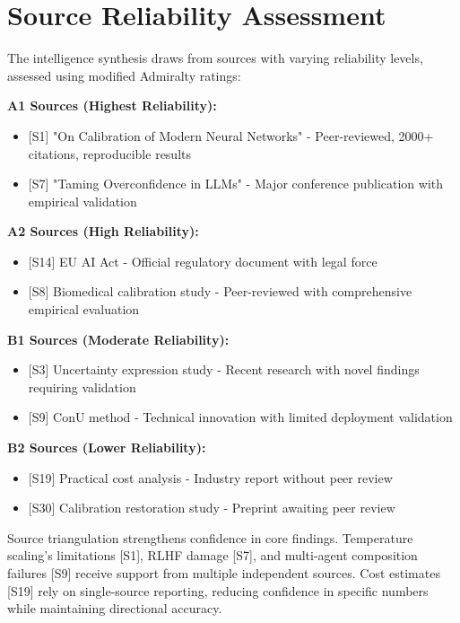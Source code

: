 \documentclass[a4paper,11pt]{article}
\begin{document}
\section{Source Reliability Assessment}

The intelligence synthesis draws from sources with varying reliability levels, assessed using modified Admiralty ratings:


\textbf{A1 Sources (Highest Reliability):}\par
\begin{itemize}
  \item \textcolor{primary}{[S1]} "On Calibration of Modern Neural Networks" - Peer-reviewed, 2000+ citations, reproducible results
  \item \textcolor{primary}{[S7]} "Taming Overconfidence in LLMs" - Major conference publication with empirical validation
\end{itemize}

\textbf{A2 Sources (High Reliability):}\par
\begin{itemize}
  \item \textcolor{primary}{[S14]} EU AI Act - Official regulatory document with legal force
  \item \textcolor{primary}{[S8]} Biomedical calibration study - Peer-reviewed with comprehensive empirical evaluation
\end{itemize}

\textbf{B1 Sources (Moderate Reliability):}\par
\begin{itemize}
  \item \textcolor{primary}{[S3]} Uncertainty expression study - Recent research with novel findings requiring validation
  \item \textcolor{primary}{[S9]} ConU method - Technical innovation with limited deployment validation
\end{itemize}

\textbf{B2 Sources (Lower Reliability):}\par
\begin{itemize}
  \item \textcolor{primary}{[S19]} Practical cost analysis - Industry report without peer review
  \item \textcolor{primary}{[S30]} Calibration restoration study - Preprint awaiting peer review
\end{itemize}

Source triangulation strengthens confidence in core findings. Temperature scaling's limitations \textcolor{primary}{[S1]}, RLHF damage \textcolor{primary}{[S7]}, and multi-agent composition failures \textcolor{primary}{[S9]} receive support from multiple independent sources. Cost estimates \textcolor{primary}{[S19]} rely on single-source reporting, reducing confidence in specific numbers while maintaining directional accuracy.
\end{document}
